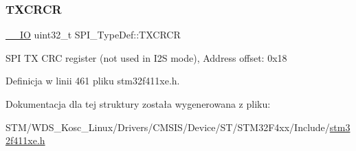 \subsubsection{\texorpdfstring{T\+X\+C\+R\+CR}{TXCRCR}}
{\footnotesize\ttfamily \hyperlink{core__sc300_8h_aec43007d9998a0a0e01faede4133d6be}{\+\_\+\+\_\+\+IO} uint32\+\_\+t S\+P\+I\+\_\+\+Type\+Def\+::\+T\+X\+C\+R\+CR}

S\+PI TX C\+RC register (not used in I2S mode), Address offset\+: 0x18 

Definicja w linii 461 pliku stm32f411xe.\+h.



Dokumentacja dla tej struktury została wygenerowana z pliku\+:\begin{DoxyCompactItemize}
\item 
S\+T\+M/\+W\+D\+S\+\_\+\+Kosc\+\_\+\+Linux/\+Drivers/\+C\+M\+S\+I\+S/\+Device/\+S\+T/\+S\+T\+M32\+F4xx/\+Include/\hyperlink{stm32f411xe_8h}{stm32f411xe.\+h}\end{DoxyCompactItemize}
